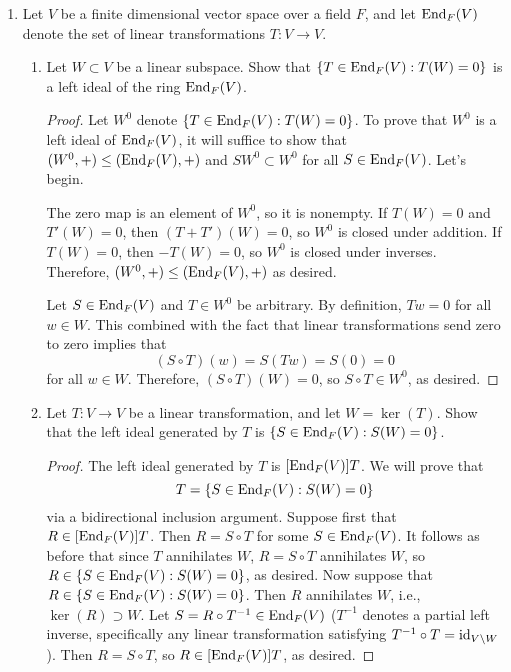 \documentclass[../psets.tex]{subfiles}
\begin{document}
\begin{enumerate}[resume]
\begin{proof}
    \end{proof}
    \item Let $V$ be a finite dimensional vector space over a field $F$, and let $\operatorname{End}_F(V)$ denote the set of linear transformations $T:V\to V$.
    \begin{enumerate}[label={(\alph*)}]
        \item Let $W\subset V$ be a linear subspace. Show that $\{T\in\operatorname{End}_F(V):T(W)=0\}$ is a left ideal of the ring $\operatorname{End}_F(V)$.
        \begin{proof}
            Let $W^0$ denote $\{T\in\operatorname{End}_F(V):T(W)=0\}$. To prove that $W^0$ is a left ideal of $\operatorname{End}_F(V)$, it will suffice to show that $(W^0,+)\leq(\operatorname{End}_F(V),+)$ and $SW^0\subset W^0$ for all $S\in\operatorname{End}_F(V)$. Let's begin.\par
            The zero map is an element of $W^0$, so it is nonempty. If $T(W)=0$ and $T'(W)=0$, then $(T+T')(W)=0$, so $W^0$ is closed under addition. If $T(W)=0$, then $-T(W)=0$, so $W^0$ is closed under inverses. Therefore, $(W^0,+)\leq(\operatorname{End}_F(V),+)$ as desired.\par
            Let $S\in\operatorname{End}_F(V)$ and $T\in W^0$ be arbitrary. By definition, $Tw=0$ for all $w\in W$. This combined with the fact that linear transformations send zero to zero implies that
            \begin{equation*}
                (S\circ T)(w) = S(Tw)
                = S(0)
                = 0
            \end{equation*}
            for all $w\in W$. Therefore, $(S\circ T)(W)=0$, so $S\circ T\in W^0$, as desired.
        \end{proof}
        \item Let $T:V\to V$ be a linear transformation, and let $W=\ker(T)$. Show that the left ideal generated by $T$ is $\{S\in\operatorname{End}_F(V):S(W)=0\}$.
        \begin{proof}
            The left ideal generated by $T$ is $[\operatorname{End}_F(V)]T$. We will prove that
            \begin{equation*}
                [\End_F(V)]T = \{S\in\End_F(V):S(W)=0\}
            \end{equation*}
            via a bidirectional inclusion argument. Suppose first that $R\in[\operatorname{End}_F(V)]T$. Then $R=S\circ T$ for some $S\in\operatorname{End}_F(V)$. It follows as before that since $T$ annihilates $W$, $R=S\circ T$ annihilates $W$, so $R\in\{S\in\operatorname{End}_F(V):S(W)=0\}$, as desired. Now suppose that $R\in\{S\in\operatorname{End}_F(V):S(W)=0\}$. Then $R$ annihilates $W$, i.e., $\ker(R)\supset W$. Let $S=R\circ T^{-1}\in\operatorname{End}_F(V)$ ($T^{-1}$ denotes a partial left inverse, specifically any linear transformation satisfying $T^{-1}\circ T=\operatorname{id}_{V\setminus W}$). Then $R=S\circ T$, so $R\in[\operatorname{End}_F(V)]T$, as desired.

\end{proof}
\end{enumerate}
\end{enumerate}
\end{document}
